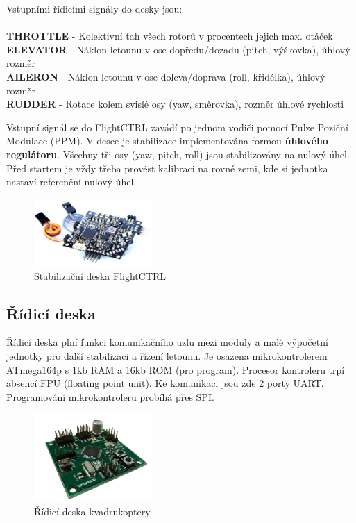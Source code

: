 \documentclass[11pt, a4paper]{article}
\begin{document}
Vstupními řídicími signály do desky jsou:
\\
\\
\textbf{THROTTLE} - Kolektivní tah všech rotorů v procentech jejich max. otáček\\
\textbf{ELEVATOR} - Náklon letounu v ose dopředu/dozadu (pitch, výškovka), úhlový rozměr\\
\textbf{AILERON} - Náklon letounu v ose doleva/doprava (roll, křidélka), úhlový rozměr\\
\textbf{RUDDER} - Rotace kolem svislé osy (yaw, směrovka), rozměr úhlové rychlosti

Vstupní signál se do FlightCTRL zavádí po jednom vodiči pomocí Pulze Poziční Modulace (PPM). V desce je stabilizace implementována formou \textbf{úhlového regulátoru}. Všechny tři osy (yaw, pitch, roll) jsou stabilizovány na nulový úhel. Před startem je vždy třeba provést kalibraci na rovné zemi, kde si jednotka nastaví referenční nulový úhel.

\begin{figure}[h]
\begin{center}
\includegraphics[width=0.4\textwidth]{fig/flightctrl.jpg}
\caption{Stabilizační deska FlightCTRL}
\label{fig:flightctrl}
\end{center}
\end{figure}

\newpage

\subsection{Řídicí deska}

Řídicí deska plní funkci komunikačního uzlu mezi moduly a malé výpočetní jednotky pro další stabilizaci a řízení letounu. Je osazena mikrokontrolerem ATmega164p s 1kb RAM a 16kb ROM (pro program). Procesor kontroleru trpí absencí FPU (floating point unit). Ke komunikaci jsou zde 2 porty UART. Programování mikrokontroleru probíhá přes SPI.

\begin{figure}[h]
\begin{center}
\includegraphics[width=0.4\textwidth]{fig/control_board.jpg}
\caption{Řídicí deska kvadrukoptery}
\label{fig:flightctrl}
\end{center}
\end{figure}
\end{document}
